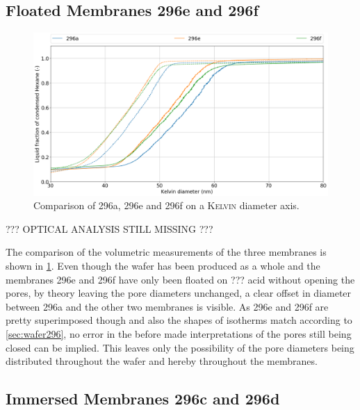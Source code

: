 \documentclass[thesis.tex]{subfiles}
\begin{document}
        \subsection{Floated Membranes 296e and 296f}
        \label{subsec:floated-membranes}

            \begin{figure}[ht]
                \centering
                \includegraphics[width=\textwidth]{images/296a_vs_296e_vs_296f_d_kelvin.png}
                \caption{Comparison of 296a, 296e and 296f on a \textsc{Kelvin} diameter axis. }
                \label{fig:floated-comp-w296}
            \end{figure}

            ??? OPTICAL ANALYSIS STILL MISSING ???

            The comparison of the volumetric measurements of the three membranes is shown in \cref{fig:floated-comp-w296}. Even though the wafer has been produced as a whole and the membranes 296e and 296f have only been floated on ??? acid without opening the pores, by theory leaving the pore diameters unchanged, a clear offset in diameter between 296a and the other two membranes is visible. As 296e and 296f are pretty superimposed though and also the shapes of isotherms match according to \cref{sec:wafer296}, no error in the before made interpretations of the pores still being closed can be implied. This leaves only the possibility of the pore diameters being distributed throughout the wafer and hereby throughout the membranes.


        \subsection{Immersed Membranes 296c and 296d}
        \label{subsec:immersed-membranes}
\end{document}
